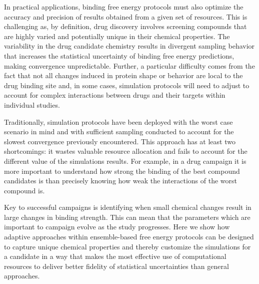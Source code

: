 In practical applications, binding free energy protocols must also optimize
the accuracy and precision of results obtained from a given set of resources.
This is challenging as, by definition, drug discovery involves screening
compounds that are highly varied and potentially unique in their chemical
properties. The variability in the drug candidate chemistry 
results in divergent sampling behavior that increases the statistical
uncertainty of binding free energy predictions, making convergence
unpredictable.
Further, a particular difficulty comes from the fact that not all changes
induced in protein shape or behavior are local to the drug binding site and,
in some cases, simulation protocols will need to adjust to account for
complex interactions between drugs and their targets within individual
studies.

Traditionally, simulation protocols have been deployed with the worst case
scenario in mind and with sufficient sampling conducted to account for the
slowest convergence previously encountered. This approach has at least two
shortcomings: it wastes valuable resource allocation and fails to account
for the different value of the simulations results. For example, in a drug
campaign it is more important to understand how strong the binding of the
best compound candidates is than precisely knowing how weak the interactions
of the worst compound is.


Key to successful campaigns is identifying when small chemical changes
result in large changes in binding strength. This can mean that the
parameters which are important to campaign evolve as the study progresses.
Here we show how adaptive approaches within ensemble-based free energy
protocols can be designed to capture unique chemical properties and thereby
customize the simulations for a candidate in a way that makes the most
effective use of computational resources to deliver better fidelity of
statistical uncertainties than general approaches.


